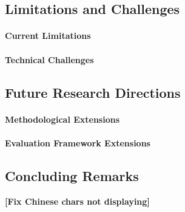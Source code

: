 \documentclass[runningheads]{llncs}
\newcommand{\matt}[1]{{\bf\color{green!50!black}[#1]}} %
\begin{document}
\subsection{Limitations and Challenges}

\paragraph{Current Limitations}

\paragraph{Technical Challenges}

\subsection{Future Research Directions}

\paragraph{Methodological Extensions}

\paragraph{Evaluation Framework Extensions}

\subsection{Concluding Remarks}

\newpage




\matt{Fix Chinese chars not displaying}
\end{document}
